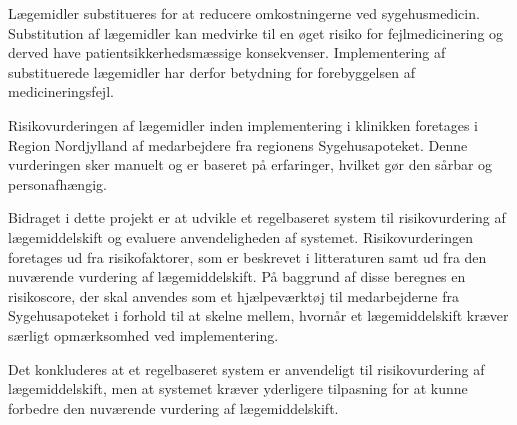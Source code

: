 \vspace{-0.3cm}
Lægemidler substitueres for at reducere omkostningerne ved sygehusmedicin. Substitution af lægemidler kan medvirke til en øget risiko for fejlmedicinering og derved have patientsikkerhedsmæssige konsekvenser. Implementering af substituerede lægemidler har derfor betydning for forebyggelsen af medicineringsfejl. 

Risikovurderingen af lægemidler inden implementering i klinikken foretages i Region Nordjylland af medarbejdere fra regionens Sygehusapoteket. Denne vurderingen sker manuelt og er baseret på erfaringer, hvilket gør den sårbar og personafhængig. 


Bidraget i dette projekt er at udvikle et regelbaseret system til risikovurdering af lægemiddelskift og evaluere anvendeligheden af systemet. Risikovurderingen foretages ud fra risikofaktorer, som er beskrevet i litteraturen samt ud fra den nuværende vurdering af lægemiddelskift. På baggrund af disse beregnes en risikoscore, der skal anvendes som et hjælpeværktøj til medarbejderne fra Sygehusapoteket i forhold til at skelne mellem, hvornår et lægemiddelskift kræver særligt opmærksomhed ved implementering.

Det konkluderes at et regelbaseret system er anvendeligt til risikovurdering af lægemiddelskift, men at systemet kræver yderligere tilpasning for at kunne forbedre den nuværende vurdering af lægemiddelskift.
\vspace{-0.2cm}